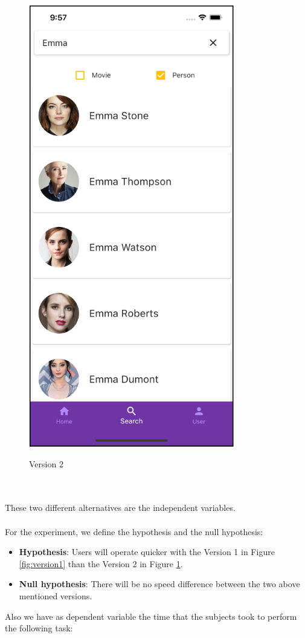 \documentclass[12pt, a4paper]{article}
\numberwithin{figure}{section}
\begin{document}
\begin{center}
\begin{minipage}{0.3\textwidth}
		\begin{figure}[H]
			\centering
			\includegraphics[width=0.8\textwidth]{images/experiment/searchCheckBox.png}\\
			\caption{Version 2}
			\label{fig:version2}
		\end{figure}
	\end{minipage}
\end{center}
\mbox{}\\\\
\noindent
These two different alternatives are the independent variables.\\\\
For the experiment, we define the hypothesis and the null hypothesis:
\begin{itemize}
	\item \textbf{Hypothesis}: Users will operate quicker with the Version 1 in Figure \ref{fig:version1} than the Version 2 in Figure \ref{fig:version2}.
	\item \textbf{Null hypothesis}: There will be no speed difference between the two above mentioned versions.
\end{itemize}
Also we have as dependent variable the time that the subjects took to perform the following task:
\end{document}
